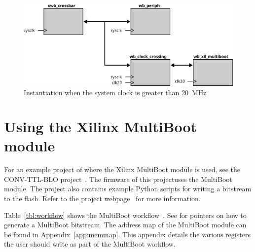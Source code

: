 \documentclass[a4paper,11pt]{article}
\newcounter{rownr}
\begin{document}
\begin{figure}
  \centerline{\includegraphics[width=\textwidth]{fig/inst-clkcross}}
  \caption{Instantiation when the system clock is greater than 20~MHz}
  \label{fig:inst-clkcross}
\end{figure}

\pagebreak
\section{Using the Xilinx MultiBoot module}
\label{sec:instantiation}

For an example project of where the Xilinx MultiBoot module is used, see the
CONV-TTL-BLO project~\cite{ctb-proj}. The firmware of this projectuses the MultiBoot
module. The project also contains example Python scripts for writing a bitstream to
the flash. Refer to the project webpage~\cite{ctb-proj} for more information.

Table~\ref{tbl:workflow} shows the MultiBoot workflow~\cite{xtp059}. See \cite{gen-bitstream}
for pointers on how to generate a MultiBoot bitstream. The address map of the MultiBoot module
can be found in Appendix~\ref{app:memmap}. This appendix details the various registers the
user should write as part of the MultiBoot workflow.

\setcounter{rownr}{0}
\end{document}
